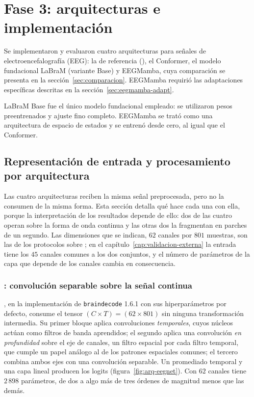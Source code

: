\section{Fase 3: arquitecturas e implementación}
\label{sec:fase3}

Se implementaron y evaluaron cuatro arquitecturas para señales de electroencefalografía (EEG): la de
referencia (\eegnet{}), el Conformer, el modelo fundacional LaBraM (variante Base) y
EEGMamba, cuya comparación se presenta en la sección~\ref{sec:comparacion}. EEGMamba
requirió las adaptaciones específicas descritas en la
sección~\ref{sec:eegmamba-adapt}.

LaBraM Base fue el único modelo fundacional empleado: se utilizaron pesos preentrenados y ajuste fino completo. EEGMamba se trató como una arquitectura de espacio de estados y se entrenó desde cero, al igual que el Conformer.

\subsection{Representación de entrada y procesamiento por arquitectura}
\label{sec:representaciones}

Las cuatro arquitecturas reciben la misma señal preprocesada, pero no la consumen de la
misma forma. Esta sección detalla qué hace cada una con ella, porque la
interpretación de los resultados depende de ello: dos de las cuatro operan sobre la forma
de onda continua y las otras dos la fragmentan en parches de un segundo. Las dimensiones que
se indican, $62$ canales por $801$ muestras, son las de los protocolos sobre \openbmi{}; en
el capítulo~\ref{cap:validacion-externa} la entrada tiene los $45$ canales comunes a los
dos conjuntos, y el número de parámetros de la capa que depende de los canales cambia en
consecuencia.

\subsubsection{\eegnet{}: convolución separable sobre la señal continua}

\eegnet{} \cite{lawhern2018}, en la implementación de \texttt{braindecode} 1.6.1
\cite{schirrmeister2017} con sus hiperparámetros por defecto, consume el tensor $(C \times T) = (62 \times 801)$ sin ninguna transformación intermedia.
Su primer bloque aplica convoluciones \emph{temporales}, cuyos núcleos actúan como filtros
de banda aprendidos; el segundo aplica una convolución \emph{en profundidad} sobre el eje
de canales, un filtro espacial por cada filtro temporal, que cumple un papel análogo al de
los patrones espaciales comunes; el tercero combina ambos ejes con una convolución
separable. Un promediado temporal y una capa lineal producen los logits
(figura~\ref{fig:arq-eegnet}). Con $62$ canales
tiene $2\,898$ parámetros, de dos a algo más de tres órdenes de magnitud menos que las demás.

